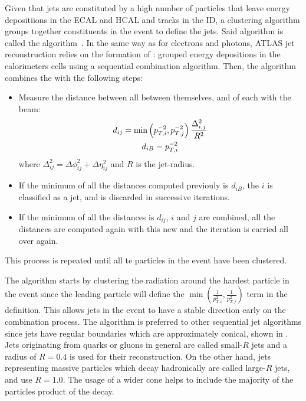 Given that jets are constituted by a high number of particles that leave energy depositiions in the \ac{ECAL} and \ac{HCAL} and tracks in the \ac{ID}, a clustering algorithm groups together constituents in the event to define the jets. Said algorithm is called the \antikt algorithm~\cite{AntiKtAlgorithm}. In the same way as for electrons and photons, \ac{ATLAS} jet reconstruction relies on the formation of \topos: grouped energy depositions in the calorimeters cells using a sequential combination algorithm. Then, the \antikt algorithm combines the \topos with the following steps:
\begin{itemize}
    \item Measure the distance between all \topos between themselves, and of each \topo with the beam:
        \begin{gather}
            d_{ij} = \min \left( p_{T,i}^{-2}, p_{T,j}^{-2} \right) \frac{\Delta_{i,j}^2}{R^2}\\
            d_{iB} = p_{T,i}^{-2}
        \end{gather}
        where \(\Delta_{ij}^2 = \Delta\phi_{ij}^2 + \Delta\eta_{ij}^2\) and \(R\) is the jet-radius.
    \item If the minimum of all the distances computed previouly is \(d_{iB}\), the \topo \(i\) is classified as a jet, and is discarded in successive iterations.
    \item If the minimum of all the distances is \(d_{ij}\), \topos \(i\) and \(j\) are combined, all the distances are computed again with this new \topo and the iteration is carried all over again.
\end{itemize}
This process is repeated until all te particles in the event have been clustered.

The \antikt algorithm starts by clustering the radiation around the hardest particle in the event since the leading \pt particle will define the \(\min \left( \frac{1}{p_{T,i}^2}, \frac{1}{p_{T,j}^2}  \right)\) term in the \dij definition. This allows jets in the event to have a stable direction early on the combination process. The \antikt algorithm is preferred to other sequential jet algorithms since jets have regular boundaries which are approximately conical, shown in \Fig{\ref{fig:objects:jets:antikt}}. Jets originating from quarks or gluons in general are called small-\(R\) jets and a radius of \(R=0.4\) is used for their reconstruction. On the other hand, jets representing massive particles which decay hadronically are called large-\(R\) jets, and use \(R=1.0\). The usage of a wider cone helps to include the majority of the particles product of the decay.



